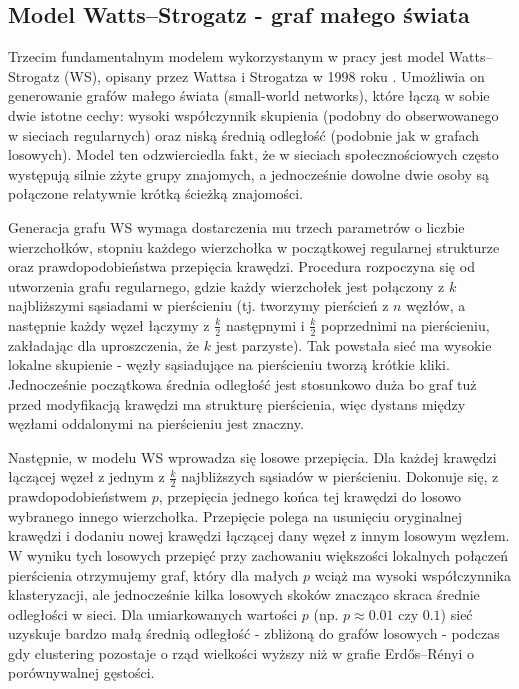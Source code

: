 \subsection{Model Watts--Strogatz - graf małego świata}
Trzecim fundamentalnym modelem wykorzystanym w pracy jest model Watts--Strogatz (WS), opisany przez Wattsa i Strogatza w 1998 roku \cite{Watts1998}. Umożliwia on generowanie grafów małego świata (small-world networks), które łączą w sobie dwie istotne cechy: wysoki współczynnik skupienia (podobny do obserwowanego w sieciach regularnych) oraz niską średnią odległość (podobnie jak w grafach losowych). Model ten odzwierciedla fakt, że w sieciach społecznościowych często występują silnie zżyte grupy znajomych, a jednocześnie dowolne dwie osoby są połączone relatywnie krótką ścieżką znajomości.

Generacja grafu WS wymaga dostarczenia mu trzech parametrów o liczbie wierzchołków, stopniu każdego wierzchołka w początkowej regularnej strukturze oraz prawdopodobieństwa przepięcia krawędzi. Procedura rozpoczyna się od utworzenia grafu regularnego, gdzie każdy wierzchołek jest połączony z $k$ najbliższymi sąsiadami w pierścieniu (tj. tworzymy pierścień z $n$ węzłów, a następnie każdy węzeł łączymy z $\frac{k}{2}$ następnymi i $\frac{k}{2}$ poprzednimi na pierścieniu, zakładając dla uproszczenia, że $k$ jest parzyste). Tak powstała sieć ma wysokie lokalne skupienie - węzły sąsiadujące na pierścieniu tworzą krótkie kliki. Jednocześnie początkowa średnia odległość jest stosunkowo duża bo graf tuż przed modyfikacją krawędzi ma strukturę pierścienia, więc dystans między węzłami oddalonymi na pierścieniu jest znaczny.

Następnie, w modelu WS wprowadza się losowe przepięcia. Dla każdej krawędzi łączącej węzeł z jednym z $\frac{k}{2}$ najbliższych sąsiadów w pierścieniu. Dokonuje się, z prawdopodobieństwem $p$, przepięcia jednego końca tej krawędzi do losowo wybranego innego wierzchołka. Przepięcie polega na usunięciu oryginalnej krawędzi i dodaniu nowej krawędzi łączącej dany węzeł z innym losowym węzłem. W wyniku tych losowych przepięć przy zachowaniu większości lokalnych połączeń pierścienia otrzymujemy graf, który dla małych $p$ wciąż ma wysoki współczynnika klasteryzacji, ale jednocześnie kilka losowych skoków znacząco skraca średnie odległości w sieci. Dla umiarkowanych wartości $p$ (np. $p \approx 0.01$ czy $0.1$) sieć uzyskuje bardzo małą średnią odległość - zbliżoną do grafów losowych - podczas gdy clustering pozostaje o rząd wielkości wyższy niż w grafie Erdős--Rényi o porównywalnej gęstości.

